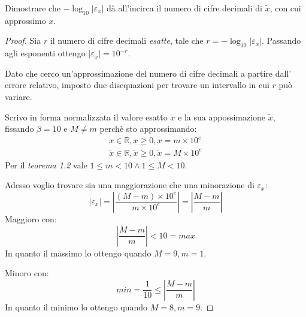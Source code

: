 \begin{exercise}
Dimostrare che $-\log_{10}{|\varepsilon_{x}|}$ d\`a all'incirca il numero 
di cifre decimali di $\tilde{x}$, con cui approssimo $x$. 
\end{exercise}
\begin{proof}
Sia $r$ il numero di cifre decimali \emph{esatte}, tale che 
$r = -\log_{10}{|\varepsilon_{x}|}$. Passando agli esponenti ottengo 
$|\varepsilon_{x}| = 10^{-r}$.

Dato che cerco un'approssimazione del numero di cifre decimali a partire dall'
errore relativo, imposto due disequazioni per trovare un intervallo in cui $r$
pu\`o variare.

Scrivo in forma normalizzata il valore esatto $x$ e la sua appossimazione 
$\tilde{x}$, fissando $\beta = 10$ e $M \not = m$ perch\`e sto approssimando:
\begin{equation*}
	\begin{split}
		x \in \mathbb{R}, x \geq 0, x = m \times 10^{e} \\
		\tilde{x} \in \mathbb{R}, \tilde{x} \geq 0, \tilde{x} = M \times 10^{e}
	\end{split}
\end{equation*}
Per il \emph{teorema 1.2} vale $ 1 \leq m < 10 \wedge  1 \leq M < 10$.

Adesso voglio trovare sia una maggiorazione che una minorazione di 
$\varepsilon_{x}$:
\begin{equation*}
	\left | \varepsilon_{x} \right | = \left | \frac{(M - m) \times 10^{e}} 
		{m \times 10^{e}}
	\right | = \left | \frac{M - m}{m} \right |
\end{equation*}
Maggioro con:
\begin{equation*}
	\left | \frac{M - m}{m} \right | < 10 = max
\end{equation*}
In quanto il massimo lo ottengo quando $M = 9, m = 1$.

Minoro con:
\begin{equation*}
	min = \frac{1}{10} \le \left | \frac{M - m}{m} \right | 
\end{equation*}
In quanto il minimo lo ottengo quando $M = 8, m = 9$.


\end{proof}
